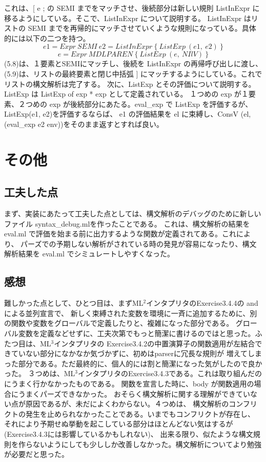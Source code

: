 \documentclass{jreport}
\begin{document}
			これは、[ e ; の SEMI までをマッチさせ、後続部分は新しい規則 ListInExpr に移るようにしている。そこで、ListInExpr について説明する。
			ListInExpr はリストの SEMI までを再帰的にマッチさせていくような規則になっている。具体的には以下の二つを持つ。
\begin{equation}e1=Expr \ SEMI \ e2=ListInExpr \ \{ \ ListExp \ (e1, \ e2) \ \}\end{equation}
\begin{equation}e=Expr \ MDLPAREN \ \{ \ ListExp \ (e, \ NIlV) \ \}\end{equation}
			(5.8)は、１要素とSEMIにマッチし、後続を ListInExpr の再帰呼び出しに渡し、(5.9)は、リストの最終要素と閉じ中括弧 ] 
			にマッチするようにしている。これでリストの構文解析は完了する。
			次に、ListExp とその評価について説明する。ListExp は ListExp of exp * exp として定義されている。
			１つめの exp が１要素、２つめの exp が後続部分にあたる。eval\_exp で ListExp を評価するが、ListExp(e1, e2)を評価するならば、
			e1 の評価結果を el に束縛し、ConsV (el, (eval\_exp e2 env))をそのまま返すとすれば良い。
    \chapter{その他}
        \section{工夫した点}
			まず、実装にあたって工夫した点としては、構文解析のデバッグのために新しいファイル syntax\_debug.mlを作ったことである。
			これは、構文解析の結果を eval.ml で評価を始まる前に出力するような関数が定義されてある。これにより、
			パーズでの予期しない解析がされている時の発見が容易になったり、構文解析結果を eval.ml でシミュレートしやすくなった。
		\section{感想}
			難しかった点として、ひとつ目は、まずML$^2$インタプリタのExercise3.4.4の and による並列宣言で、
			新しく束縛された変数を環境に一斉に追加するために、別の関数や変数をグローバルで定義したりと、複雑になった部分である。
			グローバル変数を定義などせずに、工夫次第でもっと簡潔に書けるのではと思った。ふたつ目は、ML$^3$インタプリタの
			Exercise3.4.2の中置演算子の関数適用が左結合できていない部分になかなか気づかずに、初めはparserに冗長な規則が
			増えてしまった部分である。ただ最終的に、個人的には割と簡潔になった気がしたので良かった。
			３つめは、ML$^3$インタプリタのExercise3.4.3である。これは取り組んだのにうまく行かなかったものである。
			関数を宣言した時に、body が関数適用の場合にうまくパーズできなかった。
			おそらく構文解析に関する理解ができていない点が原因であるが、未だによくわからない。４つめは、
			構文解析のコンフリクトの発生を止められなかったことである。いまでもコンフリクトが存在し、
			それにより予期せぬ挙動を起こしている部分はほとんどない気はするが(Exercise3.4.3には影響しているかもしれない)、
			出来る限り、似たような構文規則を作らないようにしても少ししか改善しなかった。構文解析についてより勉強が必要だと思った。
\end{document}
